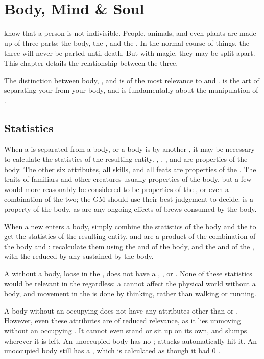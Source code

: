 \chapter{Body, Mind \& Soul}

 know that a person is not indivisible.
People, animals, and even plants are made up of three parts: the body, the {\mind}, and the {\soul}.
In the normal course of things, the three will never be parted until death.
But with magic, they may be split apart.
This chapter details the relationship between the three.

The distinction between body, {\mind}, and {\soul} is of the most relevance to  and .
 is the art of separating your {\mind} from your body, and  is fundamentally about the manipulation of {\souls}.

\section{Statistics}

When a {\mind} is separated from a body, or a body is {\possessed} by another {\mind}, it may be necessary to calculate the statistics of the resulting entity.
, , , and  are properties of the body.
The other six attributes, all skills, and all feats are properties of the {\mind}.
The traits of familiars and other creatures usually properties of the body, but a few would more reasonably be considered to be properties of the {\mind}, or even a combination of the two; the GM should use their best judgement to decide.
\capital{\damage} is a property of the body, as are any ongoing effects of brews consumed by the body.

When a new {\mind} enters a body, simply combine the statistics of the body and the {\mind} to get the statistics of the resulting entity.
 and  are a product of the combination of the body and {\mind}: recalculate them using the  and  of the body, and the  and  of the {\mind}, with the  reduced by any {\damage} sustained by the body.

A {\mind} without a body, loose in the {\mentalrealm}, does not have a , , or .
None of these statistics would be relevant in the {\mentalrealm} regardless: a {\mind} cannot affect the physical world without a body, and movement in the {\mentalrealm} is done by thinking, rather than walking or running.

A body without an occupying {\mind} does not have any attributes other than  or .
However, even these attributes are of reduced relevance, as it lies unmoving without an occupying {\mind}.
It cannot even stand or sit up on its own, and slumps wherever it is left.
An unoccupied body has no ; attacks automatically hit it.
An unoccupied body still has a , which is calculated as though it had 0 .
